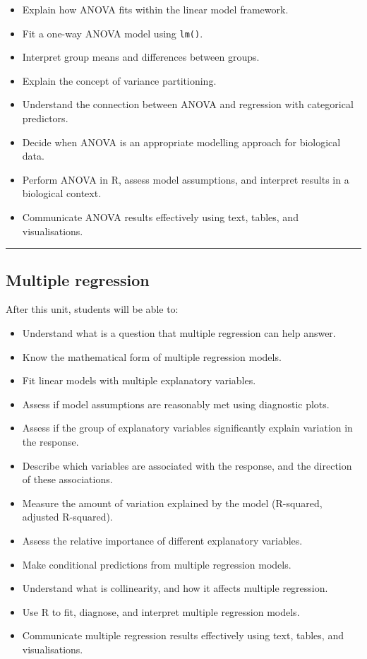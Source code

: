 \documentclass[
  letterpaper,
  8pt,
  a4paper]{book}
\providecommand{\tightlist}{%
  \setlength{\itemsep}{0pt}\setlength{\parskip}{0pt}}
\begin{document}
\begin{itemize}
\tightlist
\item
  Explain how ANOVA fits within the linear model framework.
\item
  Fit a one-way ANOVA model using \texttt{lm()}.
\item
  Interpret group means and differences between groups.
\item
  Explain the concept of variance partitioning.
\item
  Understand the connection between ANOVA and regression with
  categorical predictors.
\item
  Decide when ANOVA is an appropriate modelling approach for biological
  data.
\item
  Perform ANOVA in R, assess model assumptions, and interpret results in
  a biological context.
\item
  Communicate ANOVA results effectively using text, tables, and
  visualisations.
\end{itemize}

\begin{center}\rule{0.5\linewidth}{0.5pt}\end{center}

\subsection*{Multiple regression}\label{multiple-regression}

After this unit, students will be able to:

\begin{itemize}
\tightlist
\item
  Understand what is a question that multiple regression can help
  answer.
\item
  Know the mathematical form of multiple regression models.
\item
  Fit linear models with multiple explanatory variables.
\item
  Assess if model assumptions are reasonably met using diagnostic plots.
\item
  Assess if the group of explanatory variables significantly explain
  variation in the response.
\item
  Describe which variables are associated with the response, and the
  direction of these associations.
\item
  Measure the amount of variation explained by the model (R-squared,
  adjusted R-squared).
\item
  Assess the relative importance of different explanatory variables.
\item
  Make conditional predictions from multiple regression models.
\item
  Understand what is collinearity, and how it affects multiple
  regression.
\item
  Use R to fit, diagnose, and interpret multiple regression models.
\item
  Communicate multiple regression results effectively using text,
  tables, and visualisations.
\end{itemize}
\end{document}
